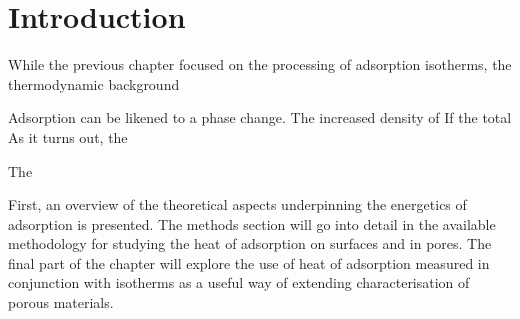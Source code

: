 
\section{Introduction}

While the previous chapter focused on the processing of adsorption
isotherms, the thermodynamic background 


Adsorption can be likened to a phase change. The increased density
of 
If the total 
As it turns out, the 

The 


First, an overview of the theoretical aspects underpinning 
the energetics of adsorption is presented. The methods 
section will go into detail in the available methodology
for studying the heat of adsorption on surfaces and in 
pores. The final part of the chapter will explore the use
of heat of adsorption measured in conjunction with isotherms
as a useful way of extending characterisation of porous
materials.
